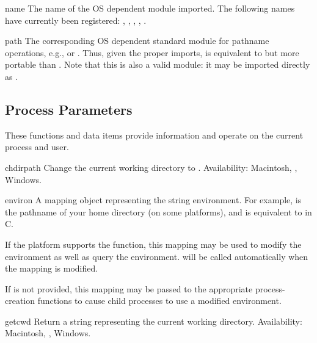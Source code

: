 \begin{datadesc}{name}
The name of the OS dependent module imported.  The following names
have currently been registered: , ,
, , .
\end{datadesc}

\begin{datadesc}{path}
The corresponding OS dependent standard module for pathname
operations, e.g.,  or .  Thus, given
the proper imports,  is equivalent to but
more portable than .  Note that this 
is also a valid module: it may be imported directly as
.
\end{datadesc}



\subsection{Process Parameters \label{os-procinfo}}

These functions and data items provide information and operate on the
current process and user.

\begin{funcdesc}{chdir}{path}
Change the current working directory to .
Availability: Macintosh, \UNIX{}, Windows.
\end{funcdesc}

\begin{datadesc}{environ}
A mapping object representing the string environment. For example,
 is the pathname of your home directory (on some
platforms), and is equivalent to  in C.

If the platform supports the  function, this
mapping may be used to modify the environment as well as query the
environment.   will be called automatically when
the mapping is modified.

If  is not provided, this mapping may be passed to
the appropriate process-creation functions to cause child processes to 
use a modified environment.
\end{datadesc}

\begin{funcdesc}{getcwd}{}
Return a string representing the current working directory.
Availability: Macintosh, \UNIX{}, Windows.
\end{funcdesc}

